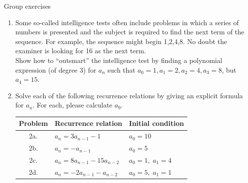 \documentclass[10pt]{beamer}
\begin{document}
\begin{frame}{Group exercises}
\begin{enumerate}
	\item Some so-called intelligence tests often include problems in which a series of numbers is presented and the subject is required to find the next term of the sequence.  For example, the sequence might begin 1,2,4,8.  No doubt the examiner is looking for 16 as the next term. \\
	\vspace{.25cm}
	Show how to \enquote{outsmart} the intelligence test by finding a polynomial expression (of degree 3) for $a_n$ such that $a_0=1, a_1=2, a_2=4, a_3=8$, but $a_4=15$.
	\vfill \vfill 
	\item Solve each of the following recurrence relations by giving an explicit formula for $a_n$.  For each, please calculate $a_9$.
	\vspace{.5cm}
	\begin{tabular}{cll}
	\toprule 
	\textbf{Problem} & \textbf{Recurrence relation} & \textbf{Initial condition} \\
	\midrule 
	2a. & $a_n = 3 a_{n-1} -1$ & $ a_0=10$ \\
	2b. &  $a_n = - a_{n-1}$ & $  a_0=5$ \\
	2c. & $a_n = 8 a_{n-1} - 15a_{n-2}$ & $a_0=1, \; a_1=4$ \\
	2d. & $a_n = -2 a_{n-1} - a_{n-2}$ & $a_0=5, \; a_1=1$ \\
	\bottomrule
	\end{tabular}

\end{enumerate}
\end{frame}
\end{document}
